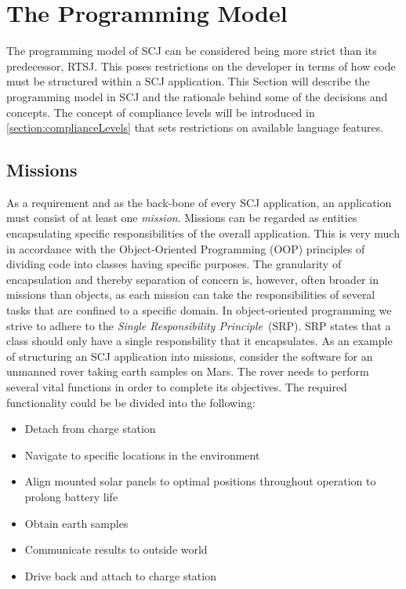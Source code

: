 \section{The Programming Model}
\label{section:programmingmodel}
The programming model of SCJ can be considered being more strict than its predecessor, RTSJ. This poses restrictions on the developer in terms of how code must be structured within a SCJ application.
This Section will describe the programming model in SCJ and the rationale behind some of the decisions and concepts. The concept of compliance levels will be introduced in \ref{section:complianceLevels} that sets restrictions on available language features.

\subsection{Missions}
As a requirement and as the back-bone of every SCJ application, an application must consist of at least one \textit{mission}. Missions can be regarded as entities encapsulating specific responsibilities of the overall application. This is very much in accordance with the Object-Oriented Programming (OOP) principles of dividing code into classes having specific purposes. The granularity of encapsulation and thereby separation of concern is, however, often broader in missions than objects, as each mission can take the responsibilities of several tasks that are confined to a specific domain. In object-oriented programming we strive to adhere to the \textit{Single Responsibility Principle}~(SRP). SRP states that a class should only have a single responsbility that it encapsulates\cite{Martin:2008:CCH:1388398}. As an example of structuring an SCJ application into missions, consider the software for an unmanned rover taking earth samples on Mars. The rover needs to perform several vital functions in order to complete its objectives. The required functionality could be be divided into the following:

\begin{itemize}
	\item Detach from charge station
	\item Navigate to specific locations in the environment
	\item Align mounted solar panels to optimal positions throughout operation to prolong battery life
	\item Obtain earth samples
	\item Communicate results to outside world
	\item Drive back and attach to charge station
\end{itemize}

